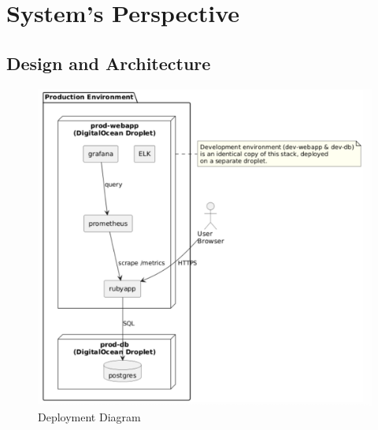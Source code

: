 


    


\section {System's Perspective}
\subsection{Design and Architecture}

\begin{figure}[H]
    \centering
    \includegraphics[width=1\linewidth]{images/deployment_diagram.png}
    \caption{Deployment Diagram}
    \label{fig:deployment}
\end{figure}

